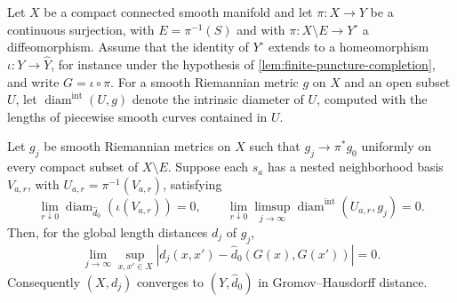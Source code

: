 Let $X$ be a compact connected smooth manifold and let $\pi\colon X\to Y$ be a continuous surjection, with $E=\pi^{-1}(S)$ and with $\pi\colon X\setminus E\to Y^\circ$ a diffeomorphism. Assume that the identity of $Y^\circ$ extends to a homeomorphism $\iota\colon Y\to\widehat Y$, for instance under the hypothesis of \cref{lem:finite-puncture-completion}, and write $G=\iota\circ\pi$. For a smooth Riemannian metric $g$ on $X$ and an open subset $U$, let $\operatorname{diam}^{\mathrm{int}}(U,g)$ denote the intrinsic diameter of $U$, computed with the lengths of piecewise smooth curves contained in $U$.

\begin{proposition}\label{prop:finite-collapse-distance}
Let $g_j$ be smooth Riemannian metrics on $X$ such that $g_j\to\pi^*g_0$ uniformly on every compact subset of $X\setminus E$. Suppose each $s_a$ has a nested neighborhood basis $V_{a,r}$, with $U_{a,r}=\pi^{-1}(V_{a,r})$, satisfying
\[
 \lim_{r\downarrow0}\operatorname{diam}_{\widehat d_0}(\iota(V_{a,r}))=0,
 \qquad
 \lim_{r\downarrow0}\limsup_{j\to\infty}
       \operatorname{diam}^{\mathrm{int}}(U_{a,r},g_j)=0.
\]
Then, for the global length distances $d_j$ of $g_j$,
\[
 \lim_{j\to\infty}\sup_{x,x'\in X}
    |d_j(x,x')-\widehat d_0(G(x),G(x'))|=0.
\]
Consequently $(X,d_j)$ converges to $(\widehat Y,\widehat d_0)$ in Gromov--Hausdorff distance.
\end{proposition}
